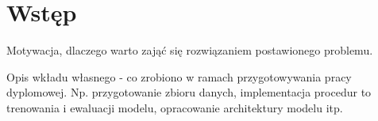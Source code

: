 \newpage %
\section{Wstęp}


Motywacja, dlaczego warto zająć się rozwiązaniem postawionego problemu.

Opis wkładu własnego - co zrobiono w ramach przygotowywania pracy dyplomowej. Np. przygotowanie zbioru danych, implementacja procedur to trenowania i ewaluacji modelu, opracowanie architektury modelu itp.

